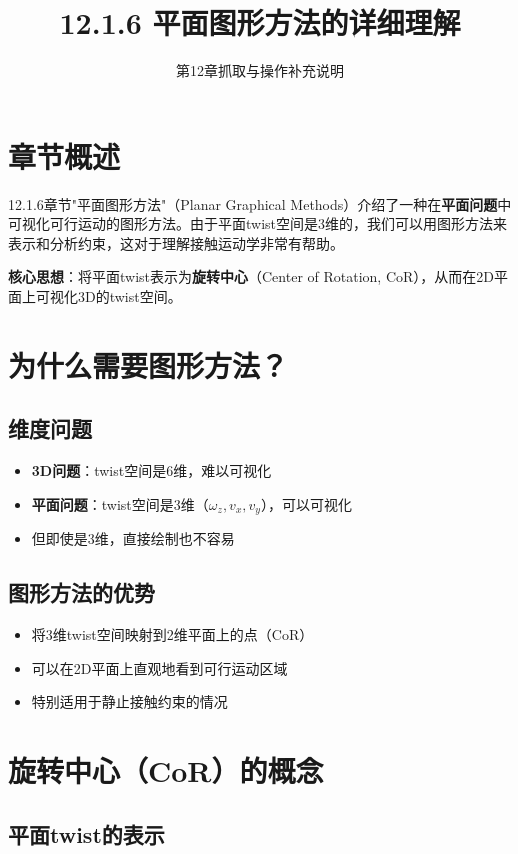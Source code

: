 \documentclass[12pt,a4paper]{article}
\title{12.1.6 平面图形方法的详细理解}
\author{第12章抓取与操作补充说明}
\date{}
\begin{document}
\maketitle

\section{章节概述}

12.1.6章节"平面图形方法"（Planar Graphical Methods）介绍了一种在\textbf{平面问题}中可视化可行运动的图形方法。由于平面twist空间是3维的，我们可以用图形方法来表示和分析约束，这对于理解接触运动学非常有帮助。

\textbf{核心思想}：将平面twist表示为\textbf{旋转中心}（Center of Rotation, CoR），从而在2D平面上可视化3D的twist空间。

\section{为什么需要图形方法？}

\subsection{维度问题}

\begin{itemize}
\item \textbf{3D问题}：twist空间是6维，难以可视化
\item \textbf{平面问题}：twist空间是3维（$\omega_z, v_x, v_y$），可以可视化
\item 但即使是3维，直接绘制也不容易
\end{itemize}

\subsection{图形方法的优势}

\begin{itemize}
\item 将3维twist空间映射到2维平面上的点（CoR）
\item 可以在2D平面上直观地看到可行运动区域
\item 特别适用于静止接触约束的情况
\end{itemize}

\section{旋转中心（CoR）的概念}

\subsection{平面twist的表示}
\end{document}
